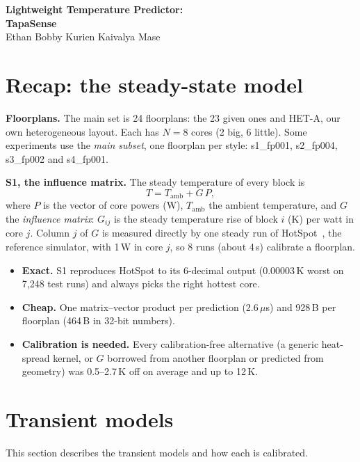 \documentclass[11pt,a4paper]{article}
\newcommand{\us}{\,$\mu$s}
\begin{document}
\begin{center}
{\LARGE\bfseries Lightweight Temperature Predictor:}\\[4pt]
{\Large\bfseries TapaSense}\\[8pt]
Ethan Bobby Kurien \quad Kaivalya Mase
\end{center}

\section{Recap: the steady-state model}\label{sec:recap}
\textbf{Floorplans.} The main set is 24 floorplans: the 23 given ones and HET-A, our own
heterogeneous layout. Each has $N = 8$ cores (2 big, 6 little). Some experiments use the
\emph{main subset}, one floorplan per style: s1\_fp001, s2\_fp004, s3\_fp002 and s4\_fp001.

\textbf{S1, the influence matrix.} The steady temperature of every block is
\begin{equation}
  T = T_\text{amb} + G\,P,
  \label{eq:s1}
\end{equation}
where $P$ is the vector of core powers (W), $T_\text{amb}$ the ambient temperature, and $G$ the
\emph{influence matrix}: $G_{ij}$ is the steady temperature rise of block $i$ (K) per watt in core
$j$. Column $j$ of $G$ is measured directly by one steady run of HotSpot~\cite{hotspot}, the
reference simulator, with 1\,W in core $j$, so
8 runs (about 4\,s) calibrate a floorplan.
\begin{itemize}
  \item \textbf{Exact.} S1 reproduces HotSpot to its 6-decimal output (0.00003\,K worst on 7{,}248
        test runs) and always picks the right hottest core.
  \item \textbf{Cheap.} One matrix--vector product per prediction (2.6\us) and 928\,B per
        floorplan (464\,B in 32-bit numbers).
  \item \textbf{Calibration is needed.} Every calibration-free alternative (a generic heat-spread
        kernel, or $G$ borrowed from another floorplan or predicted from geometry) was 0.5--2.7\,K
        off on average and up to 12\,K.
\end{itemize}

\section{Transient models}\label{sec:models}
This section describes the transient models and how each is calibrated.
\end{document}
